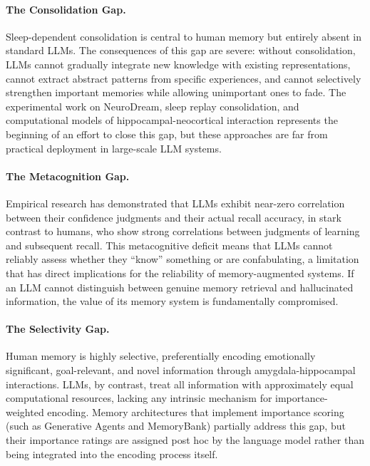 \documentclass[11pt,letterpaper]{article}
\begin{document}
\paragraph{The Consolidation Gap.} Sleep-dependent consolidation is central to human memory but entirely absent in standard LLMs. The consequences of this gap are severe: without consolidation, LLMs cannot gradually integrate new knowledge with existing representations, cannot extract abstract patterns from specific experiences, and cannot selectively strengthen important memories while allowing unimportant ones to fade. The experimental work on NeuroDream, sleep replay consolidation, and computational models of hippocampal-neocortical interaction represents the beginning of an effort to close this gap, but these approaches are far from practical deployment in large-scale LLM systems.

\paragraph{The Metacognition Gap.} Empirical research has demonstrated that LLMs exhibit near-zero correlation between their confidence judgments and their actual recall accuracy, in stark contrast to humans, who show strong correlations between judgments of learning and subsequent recall. This metacognitive deficit means that LLMs cannot reliably assess whether they ``know'' something or are confabulating, a limitation that has direct implications for the reliability of memory-augmented systems. If an LLM cannot distinguish between genuine memory retrieval and hallucinated information, the value of its memory system is fundamentally compromised.

\paragraph{The Selectivity Gap.} Human memory is highly selective, preferentially encoding emotionally significant, goal-relevant, and novel information through amygdala-hippocampal interactions. LLMs, by contrast, treat all information with approximately equal computational resources, lacking any intrinsic mechanism for importance-weighted encoding. Memory architectures that implement importance scoring (such as Generative Agents and MemoryBank) partially address this gap, but their importance ratings are assigned post hoc by the language model rather than being integrated into the encoding process itself.
\end{document}
